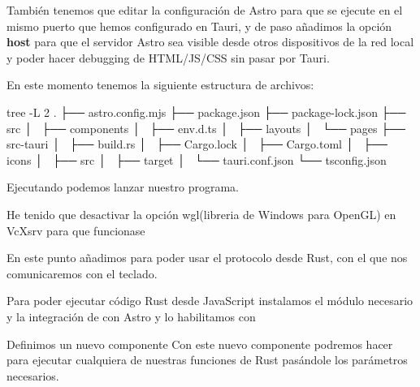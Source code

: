 También tenemos que editar la configuración de Astro para que se ejecute en el mismo puerto que hemos configurado en Tauri, y de paso añadimos la opción \textbf{host} para que el servidor Astro sea visible desde otros dispositivos de la red local y poder hacer debugging de HTML/JS/CSS sin pasar por Tauri.

En este momento tenemos la siguiente estructura de archivos:
\begin{multicli}
\cliarrow tree -L 2 \newline
.  \newline
├── astro.config.mjs \newline
├── package.json \newline
├── package-lock.json \newline
├── src \newline
│   ├── components  \newline
│   ├── env.d.ts \newline
│   ├── layouts \newline
│   └── pages \newline
├── src-tauri \newline
│   ├── build.rs \newline
│   ├── Cargo.lock \newline
│   ├── Cargo.toml \newline
│   ├── icons \newline
│   ├── src \newline
│   ├── target \newline
│   └── tauri.conf.json \newline
└── tsconfig.json
\end{multicli}

Ejecutando  podemos lanzar nuestro programa. \par

\hr
He tenido que desactivar la opción wgl(libreria de Windows para OpenGL) en VcXsrv para que funcionase
\hr

En este punto añadimos  para poder usar el protocolo  desde Rust, con el que nos comunicaremos con el teclado.

Para poder ejecutar código Rust desde JavaScript instalamos el módulo necesario  y la integración de  con Astro y lo habilitamos con 

Definimos un nuevo componente
Con este nuevo componente podremos hacer  para ejecutar cualquiera de nuestras funciones de Rust pasándole los parámetros necesarios.